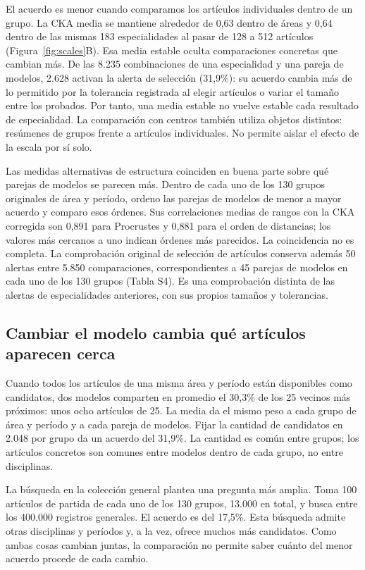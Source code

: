 \documentclass[12pt]{article}
\begin{document}
El acuerdo es menor cuando comparamos los artículos individuales dentro de un grupo. La CKA media se mantiene alrededor de 0,63 dentro de áreas y 0,64 dentro de las mismas 183 especialidades al pasar de 128 a 512 artículos (Figura~\ref{fig:scales}B). Esa media estable oculta comparaciones concretas que cambian más. De las 8.235 combinaciones de una especialidad y una pareja de modelos, 2.628 activan la alerta de selección (31,9\%): su acuerdo cambia más de lo permitido por la tolerancia registrada al elegir artículos o variar el tamaño entre los probados. Por tanto, una media estable no vuelve estable cada resultado de especialidad. La comparación con centros también utiliza objetos distintos: resúmenes de grupos frente a artículos individuales. No permite aislar el efecto de la escala por sí solo.

Las medidas alternativas de estructura coinciden en buena parte sobre qué parejas de modelos se parecen más. Dentro de cada uno de los 130 grupos originales de área y período, ordeno las parejas de modelos de menor a mayor acuerdo y comparo esos órdenes. Sus correlaciones medias de rangos con la CKA corregida son 0,891 para Procrustes y 0,881 para el orden de distancias; los valores más cercanos a uno indican órdenes más parecidos. La coincidencia no es completa. La comprobación original de selección de artículos conserva además 50 alertas entre 5.850 comparaciones, correspondientes a 45 parejas de modelos en cada uno de los 130 grupos (Tabla S4). Es una comprobación distinta de las alertas de especialidades anteriores, con sus propios tamaños y tolerancias.

\FloatBarrier
\subsection{Cambiar el modelo cambia qué artículos aparecen cerca}
Cuando todos los artículos de una misma área y período están disponibles como candidatos, dos modelos comparten en promedio el 30,3\% de los 25 vecinos más próximos: unos ocho artículos de 25. La media da el mismo peso a cada grupo de área y período y a cada pareja de modelos. Fijar la cantidad de candidatos en 2.048 por grupo da un acuerdo del 31,9\%. La cantidad es común entre grupos; los artículos concretos son comunes entre modelos dentro de cada grupo, no entre disciplinas.

La búsqueda en la colección general plantea una pregunta más amplia. Toma 100 artículos de partida de cada uno de los 130 grupos, 13.000 en total, y busca entre los 400.000 registros generales. El acuerdo es del 17,5\%. Esta búsqueda admite otras disciplinas y períodos y, a la vez, ofrece muchos más candidatos. Como ambas cosas cambian juntas, la comparación no permite saber cuánto del menor acuerdo procede de cada cambio.
\end{document}
